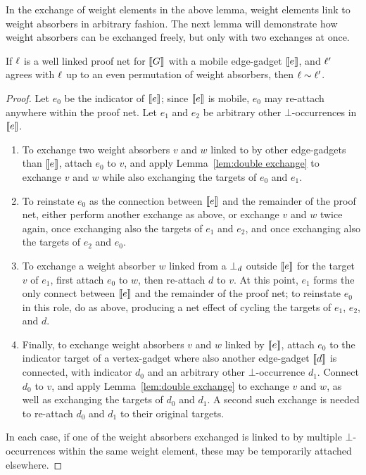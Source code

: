\documentclass{sigplanconf-modified}
\begin{document}
In the exchange of weight elements in the above lemma, weight elements link to weight absorbers in arbitrary fashion.
%
The next lemma will demonstrate how weight absorbers can be exchanged freely, but only with two exchanges at once. 



\begin{lemma}
\label{lem:permute weight absorbers}
If $\ell$ is a well linked proof net for $\llbracket G\rrbracket$ with a mobile edge-gadget $\llbracket e\rrbracket$, and $\ell'$ agrees with $\ell$ up to an even permutation of weight absorbers, then $\links\perm\links'$.
\end{lemma}

\begin{proof}
Let $e_0$ be the indicator of $\llbracket e\rrbracket$; since $\llbracket e\rrbracket$ is mobile, $e_0$ may re-attach anywhere within the proof net.
%
Let $e_1$ and $e_2$ be arbitrary other $\bot$-occurrences in $\llbracket e\rrbracket$.

\begin{enumerate}

	\item
To exchange two weight absorbers $v$ and $w$ linked to by other edge-gadgets than $\llbracket e\rrbracket$, attach $e_0$ to $v$, and apply Lemma~\ref{lem:double exchange} to exchange $v$ and $w$ while also exchanging the targets of $e_0$ and $e_1$.

	\item
To reinstate $e_0$ as the connection between $\llbracket e\rrbracket$ and the remainder of the proof net, either perform another exchange as above, or exchange $v$ and $w$ twice again, once exchanging also the targets of $e_1$ and $e_2$, and once exchanging also the targets of $e_2$ and $e_0$.

	\item
To exchange a weight absorber $w$ linked from a $\bot_{d}$ outside $\llbracket e\rrbracket$ for the target $v$ of $e_1$, first attach $e_0$ to $w$, then re-attach $d$ to $v$.
%
At this point, $e_1$ forms the only connect between $\llbracket e\rrbracket$ and the remainder of the proof net; to reinstate $e_0$ in this role, do as above, producing a net effect of cycling the targets of $e_1$, $e_2$, and $d$.

	\item
Finally, to exchange weight absorbers $v$ and $w$ linked by $\llbracket e\rrbracket$, attach $e_0$ to the indicator target of a vertex-gadget where also another edge-gadget $\llbracket d\rrbracket$ is connected, with indicator $d_0$ and an arbitrary other $\bot$-occurrence $d_1$.
%
Connect $d_0$ to $v$, and apply Lemma~\ref{lem:double exchange} to exchange $v$ and $w$, as well as exchanging the targets of $d_0$ and $d_1$.
%
A second such exchange is needed to re-attach $d_0$ and $d_1$ to their original targets.

\end{enumerate}

In each case, if one of the weight absorbers exchanged is linked to by multiple $\bot$-occurrences within the same weight element, these may be temporarily attached elsewhere.
%
\end{proof}
\end{document}
